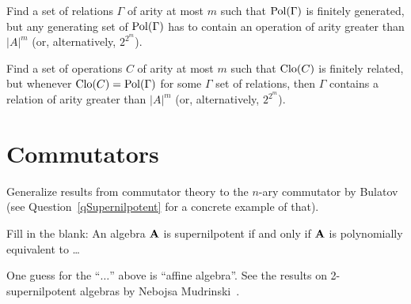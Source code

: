 \begin{question}
  Find a set of relations $\Gamma$ of arity at most $m$ such that
  $\operatorname{Pol}(\Gamma)$ is finitely generated, but any generating set
  of $\operatorname{Pol}(\Gamma)$ has to contain an operation of arity greater than $|A|^m$ (or,
  alternatively, $2^{2^m}$).
\end{question}

\begin{question}
  Find a set of operations $C$ of arity at most $m$ such that $\operatorname{Clo}(C)$ is
  finitely related, but whenever
  $\operatorname{Clo}(C)=\operatorname{Pol}(\Gamma)$ for some $\Gamma$ set of relations, then $\Gamma$
  contains a relation of arity greater than $|A|^m$ (or, alternatively,
  $2^{2^m}$).
\end{question}


\section{Commutators}
\begin{question}
Generalize results from commutator theory to the $n$-ary commutator by
Bulatov~\cite{bulatov-on-the-number-of-maltsevs} (see Question~\ref{qSupernilpotent} for a concrete example of
that).
\end{question}

\begin{question}\label{qSupernilpotent}
  Fill in the blank: An algebra ${\mathbf{A}}$ is supernilpotent if and only if
  ${\mathbf{A}}$ is polynomially equivalent to \dots
\end{question}
\begin{context}
  One guess for the ``$\dots$'' above is ``affine algebra''. See the results on
  2-supernilpotent algebras by Nebojsa Mudrinski~\cite{nebojsa}.
\end{context}


